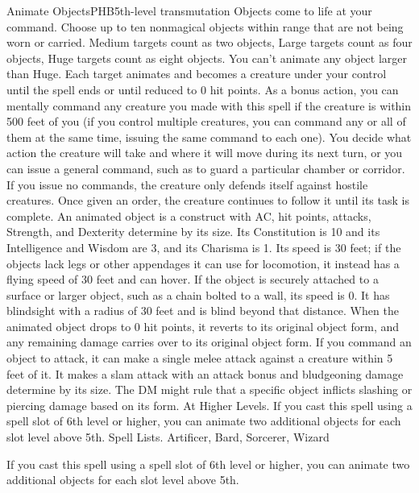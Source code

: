 \begin{spell}{Animate Objects}{PHB}{5th-level transmutation}
{
}
Objects come to life at your command. Choose up to ten nonmagical objects within range that are not being worn or carried. Medium targets count as two objects, Large targets count as four objects, Huge targets count as eight objects. You can’t animate any object larger than Huge. Each target animates and becomes a creature under your control until the spell ends or until reduced to 0 hit points.
As a bonus action, you can mentally command any creature you made with this spell if the creature is within 500 feet of you (if you control multiple creatures, you can command any or all of them at the same time, issuing the same command to each one). You decide what action the creature will take and where it will move during its next turn, or you can issue a general command, such as to guard a particular chamber or corridor. If you issue no commands, the creature only defends itself against hostile creatures. Once given an order, the creature continues to follow it until its task is complete.
An animated object is a construct with AC, hit points, attacks, Strength, and Dexterity determine by its size. Its Constitution is 10 and its Intelligence and Wisdom are 3, and its Charisma is 1. Its speed is 30 feet; if the objects lack legs or other appendages it can use for locomotion, it instead has a flying speed of 30 feet and can hover. If the object is securely attached to a surface or larger object, such as a chain bolted to a wall, its speed is 0. It has blindsight with a radius of 30 feet and is blind beyond that distance. When the animated object drops to 0 hit points, it reverts to its original object form, and any remaining damage carries over to its original object form.
If you command an object to attack, it can make a single melee attack against a creature within 5 feet of it. It makes a slam attack with an attack bonus and bludgeoning damage determine by its size. The DM might rule that a specific object inflicts slashing or piercing damage based on its form.
At Higher Levels. If you cast this spell using a spell slot of 6th level or higher, you can animate two additional objects for each slot level above 5th.
Spell Lists. Artificer, Bard, Sorcerer, Wizard

 If you cast this spell using a spell slot of 6th level or higher, you can animate two additional objects for each slot level above 5th.
\end{spell}

